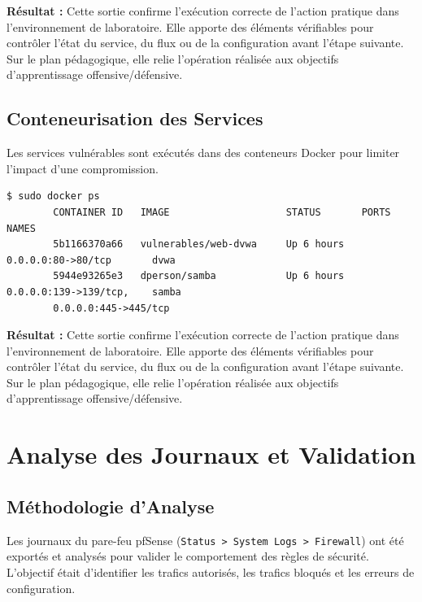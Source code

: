 \documentclass[12pt,a4paper,openany]{report}
\begin{document}
	\textbf{Résultat :} Cette sortie confirme l'exécution correcte de l'action pratique dans l'environnement de laboratoire. Elle apporte des éléments vérifiables pour contrôler l'état du service, du flux ou de la configuration avant l'étape suivante. Sur le plan pédagogique, elle relie l'opération réalisée aux objectifs d'apprentissage offensive/défensive.
	
	
	\subsection{Conteneurisation des Services}
	Les services vulnérables sont exécutés dans des conteneurs Docker pour limiter l'impact d'une compromission.
	
	\begin{lstlisting}[caption=Conteneurs Actifs sur Ubuntu DMZ]
		$ sudo docker ps
		CONTAINER ID   IMAGE                    STATUS       PORTS                    NAMES
		5b1166370a66   vulnerables/web-dvwa     Up 6 hours   0.0.0.0:80->80/tcp       dvwa
		5944e93265e3   dperson/samba            Up 6 hours   0.0.0.0:139->139/tcp,    samba
		0.0.0.0:445->445/tcp
	\end{lstlisting}
	
	\textbf{Résultat :} Cette sortie confirme l'exécution correcte de l'action pratique dans l'environnement de laboratoire. Elle apporte des éléments vérifiables pour contrôler l'état du service, du flux ou de la configuration avant l'étape suivante. Sur le plan pédagogique, elle relie l'opération réalisée aux objectifs d'apprentissage offensive/défensive.
	
	
	\section{Analyse des Journaux et Validation}
	
	\subsection{Méthodologie d'Analyse}
	Les journaux du pare-feu pfSense (\texttt{Status > System Logs > Firewall}) ont été exportés et analysés pour valider le comportement des règles de sécurité. L'objectif était d'identifier les trafics autorisés, les trafics bloqués et les erreurs de configuration.
	
\end{document}
